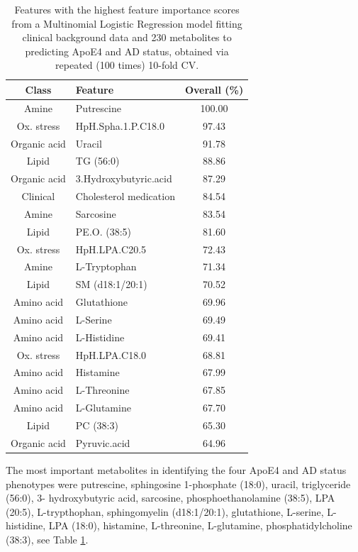 \documentclass{amsart}
\begin{document}
\begin{table}[H] 
	\centering
	\caption{\label{tab:fimp} Features with the highest feature importance scores from a Multinomial Logistic Regression model fitting clinical background data and 230 metabolites to predicting ApoE4 and AD status, obtained via repeated (100 times) 10-fold CV.}
	\begin{tabular}{clc}
		\toprule
      Class &	Feature & Overall (\%) \\ \midrule
    Amine & Putrescine            & 100.00 \\
    Ox. stress & HpH.Spha.1.P.C18.0    & 97.43  \\
    Organic acid & Uracil         & 91.78  \\
    Lipid & TG (56:0)             & 88.86  \\
    Organic acid & 3.Hydroxybutyric.acid & 87.29  \\
    Clinical & Cholesterol medication   & 84.54  \\
    Amine & Sarcosine             & 83.54  \\
    Lipid & PE.O. (38:5)          & 81.60  \\
    Ox. stress & HpH.LPA.C20.5    & 72.43  \\
    Amine & L-Tryptophan          & 71.34  \\
    Lipid & SM (d18:1/20:1)       & 70.52  \\
    Amino acid & Glutathione      & 69.96  \\
    Amino acid & L-Serine         & 69.49  \\
    Amino acid & L-Histidine      & 69.41  \\
    Ox. stress & HpH.LPA.C18.0    & 68.81  \\
    Amino acid & Histamine        & 67.99  \\
    Amino acid & L-Threonine      & 67.85  \\
    Amino acid & L-Glutamine      & 67.70  \\
    Lipid & PC (38:3)             & 65.30  \\
    Organic acid & Pyruvic.acid   & 64.96 \\ \bottomrule
	\end{tabular}
\end{table}
The most important metabolites in identifying the four ApoE4 and AD status phenotypes were putrescine, sphingosine 1-phosphate (18:0), uracil, triglyceride (56:0), 3- hydroxybutyric acid, sarcosine, phosphoethanolamine (38:5), LPA (20:5), L-trypthophan, sphingomyelin (d18:1/20:1), glutathione, L-serine, L-histidine, LPA (18:0), histamine, L-threonine, L-glutamine, phosphatidylcholine (38:3), see Table \ref{tab:fimp}. 
\end{document}
